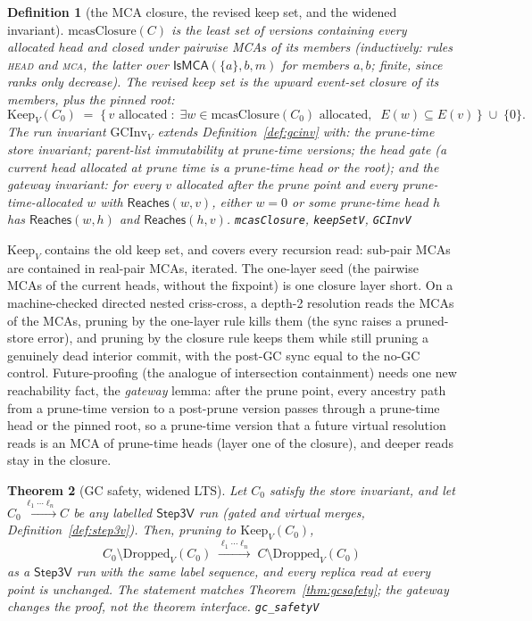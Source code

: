 \documentclass[11pt]{article}
\newtheorem{theorem}{Theorem}[section]
\newtheorem{definition}[theorem]{Definition}
\newcommand{\lean}[1]{\texttt{#1}}
\begin{document}
\begin{definition}[the MCA closure, the revised keep set, and the widened invariant]
\label{def:mcasclosure}
$\mathrm{mcasClosure}(C)$ is the least set of versions containing every
allocated head and closed under pairwise MCAs of its members
(inductively: rules \textsc{head} and \textsc{mca}, the latter over
$\mathsf{IsMCA}(\{a\}, b, m)$ for members $a, b$; finite, since ranks
only decrease). The revised keep set is the upward event-set closure of
its members, plus the pinned root:
\[
  \mathrm{Keep}_V(C_0) \;=\; \bigl\{\, v \text{ allocated} \;:\;
  \exists w \in \mathrm{mcasClosure}(C_0) \text{ allocated},\;\;
  E(w) \subseteq E(v) \,\bigr\} \;\cup\; \{0\}.
\]
The run invariant $\mathrm{GCInv}_V$ extends
Definition~\ref{def:gcinv} with: the \emph{prune-time} store invariant;
parent-list immutability at prune-time versions; the \emph{head gate}
(a current head allocated at prune time is a prune-time head or the
root); and the \emph{gateway} invariant: for every $v$ allocated after
the prune point and every prune-time-allocated $w$ with
$\mathsf{Reaches}(w, v)$, either $w = 0$ or some prune-time head $h$ has
$\mathsf{Reaches}(w, h)$ and $\mathsf{Reaches}(h, v)$.
\hfill\lean{mcasClosure}, \lean{keepSetV}, \lean{GCInvV}
\end{definition}

$\mathrm{Keep}_V$ contains the old keep set,
and covers every recursion read: sub-pair MCAs are contained in
real-pair MCAs, iterated. The one-layer seed (the
pairwise MCAs of the current heads, without the fixpoint) is
one closure layer short. On a machine-checked directed nested
criss-cross, a depth-2 resolution reads the MCAs of the MCAs, pruning
by the one-layer rule kills them (the sync raises a pruned-store
error), and pruning by the closure rule keeps them while still pruning
a genuinely dead interior commit, with the post-GC sync equal to the
no-GC control. Future-proofing (the analogue of intersection
containment) needs one new reachability fact, the \emph{gateway}
lemma: after the prune point, every ancestry path from a prune-time
version to a post-prune version passes through a prune-time head or
the pinned root, so a prune-time version that a future virtual
resolution reads is an MCA of prune-time heads (layer one of the
closure), and deeper reads stay in the closure.

\begin{theorem}[GC safety, widened LTS]
\label{thm:gcsafetyV}
Let $C_0$ satisfy the store invariant, and let
$C_0 \xrightarrow{\ell_1 \cdots \ell_n} C$ be any labelled
$\mathsf{Step3V}$ run (gated \emph{and} virtual merges,
Definition~\ref{def:step3v}). Then, pruning to $\mathrm{Keep}_V(C_0)$,
\[
  C_0 \setminus \mathrm{Dropped}_V(C_0)
  \;\xrightarrow{\ell_1 \cdots \ell_n}\;
  C \setminus \mathrm{Dropped}_V(C_0)
\]
as a $\mathsf{Step3V}$ run with the same label sequence, and every
replica read at every point is unchanged. The statement matches
Theorem~\ref{thm:gcsafety}; the gateway changes the proof, not the
theorem interface.
\hfill\lean{gc\_safetyV}
\end{theorem}
\end{document}
